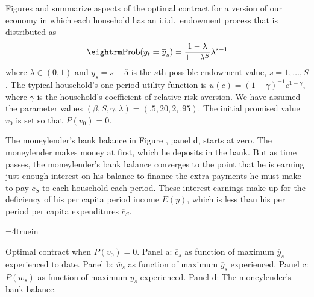 Figures 
and   summarize aspects of the optimal contract for a version
of our economy in which each household has an i.i.d.\ endowment
process that is distributed as
$$ {\rm Prob} (y_t = \overline y_s) = {1-\lambda\over 1-\lambda^S }
 \lambda^{s-1}  $$
where $\lambda \in (0,1)$ and $\overline y_s = s+5$ is the $s$th possible
endowment value, $s=1, \ldots, S$.  The typical household's one-period
utility function is $u(c) = (1-\gamma)^{-1} c^{1-\gamma}$, where $\gamma$
is the household's coefficient of relative risk aversion.  We have assumed
the parameter values $(\beta, S, \gamma, \lambda) = (.5, 20, 2, .95)$.
The initial promised value $v_0$ is set so that $P(v_0)=0$.


The moneylender's bank balance in Figure , panel d, starts at
zero. The moneylender makes money at first, which he deposits in
the bank.  But as time passes, the moneylender's bank balance
converges to the point that he is earning just enough interest on
his balance to finance the extra payments he must make to pay
$\overline c_S$ to each household each period.  These interest
earnings make up for the deficiency of his per capita period
income $E(y)$, which is less than his per period per capita
expenditures $\overline c_S$.


\centerline{\epsfxsize=4truein}
\caption{Optimal contract when $P(v_0)=0$.  Panel a: $\overline c_s$ as function of
maximum $\overline y_s$ experienced to date.  Panel b: $\overline w_s$ as function of maximum $\overline y_s$
experienced.  Panel c: $P(\overline w_s)$ as function of maximum $\overline y_s$ experienced. Panel d: The
moneylender's bank balance.}
\endfigure


